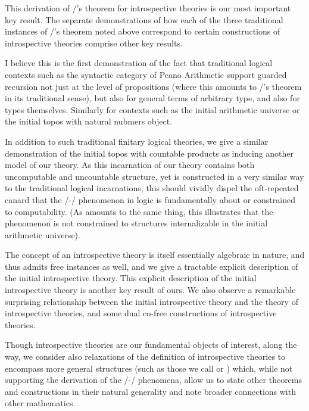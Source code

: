 This derivation of \Loeb/'s theorem for introspective theories is our most important key result. The separate demonstrations of how each of the three traditional instances of \Loeb/'s theorem noted above correspond to certain constructions of introspective theories comprise other key results.

I believe this is the first demonstration of the fact that traditional logical contexts such as the syntactic category of Peano Arithmetic support guarded recursion not just at the level of propositions (where this amounts to \Loeb/'s theorem in its traditional sense), but also for general terms of arbitrary type, and also for types themselves. Similarly for contexts such as the initial arithmetic universe or the initial topos with natural nubmers object.

In addition to such traditional finitary logical theories, we give a similar demonstration of the initial topos with countable products as inducing another model of our theory. As this incarnation of our theory contains both uncomputable and uncountable structure, yet is constructed in a very similar way to the traditional logical incarnations, this should vividly dispel the oft-repeated canard that the \Godel/-\Lob/ phenomenon in logic is fundamentally about or constrained to computability. (As amounts to the same thing, this illustrates that the phenomenon is not constrained to structures internalizable in the initial arithmetic universe).

The concept of an introspective theory is itself essentially algebraic in nature, and thus admits free instances as well, and we give a tractable explicit description of the initial introspective theory. This explicit description of the initial introspective theory is another key result of ours. We also observe a remarkable surprising relationship between the initial introspective theory and the theory of introspective theories, and some dual co-free constructions of introspective theories.

Though introspective theories are our fundamental objects of interest, along the way, we consider also relaxations of the definition of introspective theories to encompass more general structures (such as those we call  or ) which, while not supporting the derivation of the \Godel/-\Lob/ phenomena, allow us to state other theorems and constructions in their natural generality and note broader connections with other mathematics.


\fileend
